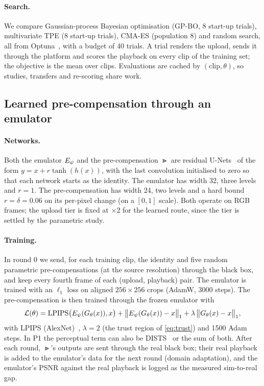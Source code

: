 \paragraph{Search.}
We compare Gaussian-process Bayesian optimisation (GP-BO, 8 start-up trials), multivariate
TPE (8 start-up trials), CMA-ES (population 8) and random search, all from
Optuna~\cite{akiba2019optuna}, with a budget of 40 trials. A trial renders the upload, sends it
through the platform and scores the playback on every clip of the training set; the objective is
the mean over clips. Evaluations are cached by $(\text{clip},\theta)$, so studies, transfers and
re-scoring share work.

\subsection{Learned pre-compensation through an emulator}
\label{sec:learned}

\paragraph{Networks.}
Both the emulator $E_{\psi}$ and the pre-compensation $\Gt$ are residual U-Nets~\cite{ronneberger2015unet}
of the form $y = x + r\tanh(h(x))$, with the last convolution initialised to zero so that each
network starts as the identity. The emulator has width 32, three levels and $r=1$. The
pre-compensation has width 24, two levels and a hard bound $r=\delta=0.06$ on its per-pixel change
(on a $[0,1]$ scale). Both operate on RGB frames; the upload tier is fixed at $\times 2$ for the
learned route, since the tier is settled by the parametric study.

\paragraph{Training.}
In round 0 we send, for each training clip, the identity and five random parametric
pre-compensations (at the source resolution) through the black box, and keep every fourth frame of
each (upload, playback) pair. The emulator is trained with an $\ell_1$ loss on aligned
$256\times256$ crops (AdamW, 3000 steps). The pre-compensation is then trained through the frozen
emulator with
\begin{equation}
  \mathcal{L}(\theta) = \mathrm{LPIPS}\big(E_{\psi}(G_{\theta}(x)), x\big)
  + \big\|E_{\psi}(G_{\theta}(x)) - x\big\|_1
  + \lambda\,\big\|G_{\theta}(x) - x\big\|_1,
  \label{eq:gloss}
\end{equation}
with LPIPS (AlexNet)~\cite{zhang2018unreasonable}, $\lambda=2$ (the trust region of
\cref{eq:trust}) and 1500 Adam steps. In P1 the perceptual term can also be
DISTS~\cite{ding2022image} or the sum of both. After each round, $\Gt$'s outputs are sent through the
real black box; their real playback is added to the emulator's data for the next round (domain
adaptation), and the emulator's PSNR against the real playback is logged as the measured
sim-to-real gap.

